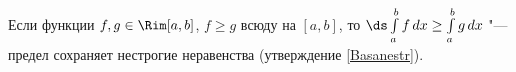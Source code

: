 \label{Rimnestr}
 	Если функции $f,g\in\Rim[a,b]$, $f\geq g$ всюду на $[a,b]$, то $\ds\int\limits_a^bf\,dx\geq\int\limits_a^bg\,dx$ "--- предел
 	сохраняет нестрогие неравенства (утверждение \ref{Basanestr}).
 